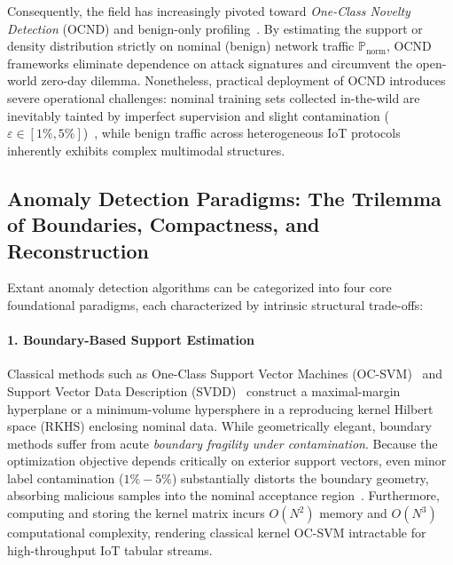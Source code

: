 Consequently, the field has increasingly pivoted toward \emph{One-Class Novelty Detection} (OCND) and benign-only profiling~\cite{shin2005one,DeepSVDD}. By estimating the support or density distribution strictly on nominal (benign) network traffic $\mathbb{P}_{\text{norm}}$, OCND frameworks eliminate dependence on attack signatures and circumvent the open-world zero-day dilemma. Nonetheless, practical deployment of OCND introduces severe operational challenges: nominal training sets collected in-the-wild are inevitably tainted by imperfect supervision and slight contamination ($\varepsilon \in [1\%, 5\%]$)~\cite{prabowo2026unclean}, while benign traffic across heterogeneous IoT protocols inherently exhibits complex multimodal structures.

\subsection{Anomaly Detection Paradigms: The Trilemma of Boundaries, Compactness, and Reconstruction}
\label{subsec:rel_ad_paradigms}

Extant anomaly detection algorithms can be categorized into four core foundational paradigms, each characterized by intrinsic structural trade-offs:

\paragraph{1. Boundary-Based Support Estimation}
Classical methods such as One-Class Support Vector Machines (OC-SVM)~\cite{scholkopf2001estimating} and Support Vector Data Description (SVDD)~\cite{tax2004support} construct a maximal-margin hyperplane or a minimum-volume hypersphere in a reproducing kernel Hilbert space (RKHS) enclosing nominal data. While geometrically elegant, boundary methods suffer from acute \emph{boundary fragility under contamination}. Because the optimization objective depends critically on exterior support vectors, even minor label contamination ($1\% - 5\%$) substantially distorts the boundary geometry, absorbing malicious samples into the nominal acceptance region~\cite{han2022adbench,DeepSVDD}. Furthermore, computing and storing the kernel matrix incurs $O(N^2)$ memory and $O(N^3)$ computational complexity, rendering classical kernel OC-SVM intractable for high-throughput IoT tabular streams.


